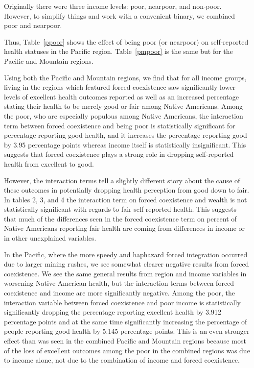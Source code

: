 \documentclass[12pt]{article}
\begin{document}
Originally there were three income levels: poor, nearpoor, and non-poor.
However, to simplify things and work with a convenient binary, we combined poor and nearpoor.

Thus, Table~\ref{ppoor} shows the effect of being poor (or nearpoor) on self-reported health statuses in the Pacific region.
Table~\ref{pmpoor} is the same but for the Pacific and Mountain regions.

Using both the Pacific and Mountain regions, we find that for all income groups, living in the regions which featured forced coexistence saw significantly lower levels of excellent health outcomes reported as well as an increased percentage stating their health to be merely good or fair among Native Americans.
Among the poor, who are especially populous among Native Americans, the interaction term between forced coexistence and being poor is statistically significant for percentage reporting good health, and it increases the percentage reporting good by 3.95 percentage points whereas income itself is statistically insignificant.
This suggests that forced coexistence plays a strong role in dropping self-reported health from excellent to good.

However, the interaction terms tell a slightly different story about the cause of these outcomes in potentially dropping health perception from good down to fair. 
In tables 2, 3, and 4 the interaction term on forced coexistence and wealth is not statistically significant with regards to fair self-reported health. 
This suggests that much of the differences seen in the forced coexistence term on percent of Native Americans reporting fair health are coming from differences in income or in other unexplained variables.  

In the Pacific, where the more speedy and haphazard forced integration occurred due to larger mining rushes, we see somewhat clearer negative results from forced coexistence. 
We see the same general results from region and income variables in worsening Native American health, but the interaction terms between forced coexistence and income are more significantly negative.  
Among the poor, the interaction variable between forced coexistence and poor income is statistically significantly dropping the percentage reporting excellent health by 3.912 percentage points and at the same time significantly increasing the percentage of people reporting good health by 5.145 percentage points.  
This is an even stronger effect than was seen in the combined Pacific and Mountain regions because most of the loss of excellent outcomes among the poor in the combined regions was due to income alone, not due to the combination of income and forced coexistence.
\end{document}
